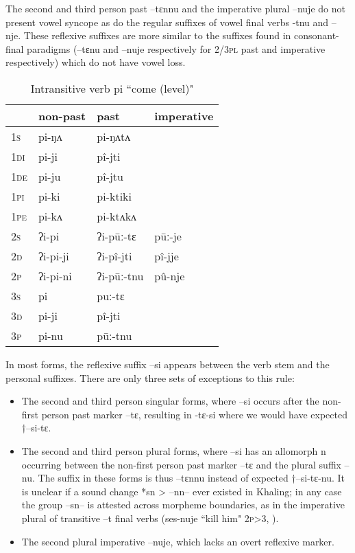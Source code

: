\documentclass[twoside,a4paper,11pt]{article}
\newcommand{\ipa}[1]{{\phon#1}}
\begin{document}
 The second and third person past \ipa{--tɛnnu} and  the imperative plural \ipa{--nuje} do not present vowel syncope as do the regular  suffixes of vowel final verbs \ipa{-tnu} and \ipa{--nje}. These reflexive suffixes are more similar to the suffixes found in   consonant-final paradigms (\ipa{--tɛnu} and \ipa{--nuje} respectively for \textsc{2/3pl} past and imperative respectively) which do not have vowel loss.
 


\begin{table}[h] 
\caption{Intransitive verb \ipa{pi} ``come (level)" } \centering \label{tab:pi}
\begin{tabular}{l|l|l|l}  
 \toprule
& non-past & past & imperative\\
\midrule
\textsc{1s}  &  \ipa{pi-ŋʌ}  &  \ipa{pi-ŋʌtʌ}   \\
\textsc{1di}  &  \ipa{pi-ji}  &  \ipa{pî-jti}   \\
\textsc{1de}  &  \ipa{pi-ju}  &  \ipa{pî-jtu}   \\
\textsc{1pi}  &  \ipa{pi-ki}  &  \ipa{pi-ktiki}   \\
\textsc{1pe}  &  \ipa{pi-kʌ}  &  \ipa{pi-ktʌkʌ}   \\
\midrule
\textsc{2s}  &  \ipa{ʔi-pi}  &  \ipa{ʔi-pūː-tɛ}  &  \ipa{pūː-je}   \\
\textsc{2d}  &  \ipa{ʔi-pi-ji}  &  \ipa{ʔi-pî-jti}  &  \ipa{pî-jje}   \\
\textsc{2p}  &  \ipa{ʔi-pi-ni}  &  \ipa{ʔi-pūː-tnu}  &  \ipa{pû-nje}   \\
\midrule
\textsc{3s}  &  \ipa{pi}  &  \ipa{puː-tɛ}   \\
\textsc{3d}  &  \ipa{pi-ji}  &  \ipa{pî-jti}   \\
\textsc{3p}  &  \ipa{pi-nu}  &  \ipa{pūː-tnu}   \\
\bottomrule
\end{tabular}
\end{table}


In most forms, the reflexive suffix \ipa{--si} appears between the verb stem and the personal suffixes. There are only three sets of exceptions to this rule:

\begin{itemize}
\item The second and third person singular forms, where \ipa{--si} occurs after the  non-first person past marker \ipa{--tɛ}, resulting in \ipa{-tɛ-si} where we would have expected †\ipa{--si-tɛ}.
\item The   second and third person plural forms, where \ipa{--si} has an allomorph  \ipa{n} occurring between the  non-first person past marker \ipa{--tɛ}  and the plural suffix --\ipa{nu}.  The suffix in these forms is thus \ipa{--tɛnnu} instead of expected †\ipa{--si-tɛ-nu}. It is unclear if a sound change *sn > --\ipa{nn}-- ever existed in Khaling; in any case the group \ipa{--sn--} is attested across morpheme boundaries, as in the imperative plural of transitive \ipa{--t} final verbs (\ipa{ses-nuje} ``kill him" \textsc{2p>3},  \citealt[1118]{jacques12khaling}). 
\item The second plural imperative \ipa{--nuje}, which lacks an  overt reflexive marker.
\end{itemize}
\end{document}
